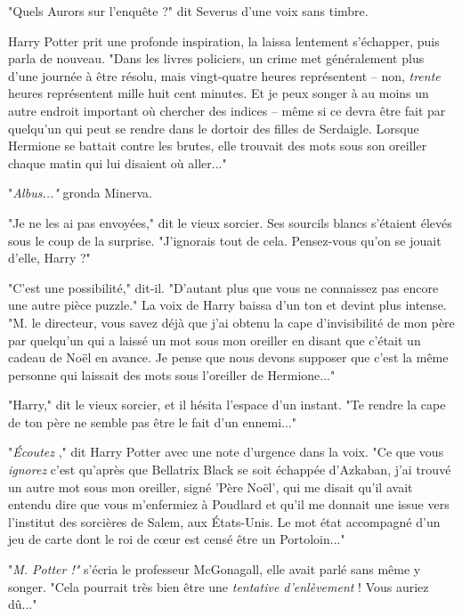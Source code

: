 "Quels Aurors sur l'enquête ?" dit Severus d'une voix sans timbre.

Harry Potter prit une profonde inspiration, la laissa lentement s'échapper, puis parla de nouveau. "Dans les livres policiers, un crime met généralement plus d'une journée à être résolu, mais vingt-quatre heures représentent – non, \emph{trente}  heures représentent mille huit cent minutes. Et je peux songer à au moins un autre endroit important où chercher des indices – même si ce devra être fait par quelqu'un qui peut se rendre dans le dortoir des filles de Serdaigle. Lorsque Hermione se battait contre les brutes, elle trouvait des mots sous son oreiller chaque matin qui lui disaient où aller..."

"\emph{Albus..."}  gronda Minerva.

"Je ne les ai pas envoyées," dit le vieux sorcier. Ses sourcils blancs s'étaient élevés sous le coup de la surprise. "J'ignorais tout de cela. Pensez-vous qu'on se jouait d'elle, Harry ?"

"C'est une possibilité," dit-il. "D'autant plus que vous ne connaissez pas encore une autre pièce puzzle." La voix de Harry baissa d'un ton et devint plus intense. "M. le directeur, vous savez déjà que j'ai obtenu la cape d'invisibilité de mon père par quelqu'un qui a laissé un mot sous mon oreiller en disant que c'était un cadeau de Noël en avance. Je pense que nous devons supposer que c'est la même personne qui laissait des mots sous l'oreiller de Hermione..."

"Harry," dit le vieux sorcier, et il hésita l'espace d'un instant. "Te rendre la cape de ton père ne semble pas être le fait d'un ennemi..."

"\emph{Écoutez} ," dit Harry Potter avec une note d'urgence dans la voix. "Ce que vous \emph{ignorez}  c'est qu'après que Bellatrix Black se soit échappée d'Azkaban, j'ai trouvé un autre mot sous mon oreiller, signé 'Père Noël', qui me disait qu'il avait entendu dire que vous m'enfermiez à Poudlard et qu'il me donnait une issue vers l'institut des sorcières de Salem, aux États-Unis. Le mot état accompagné d'un jeu de carte dont le roi de cœur est censé être un Portoloin..."

"\emph{M. Potter !"}  s'écria le professeur McGonagall, elle avait parlé sans même y songer. "Cela pourrait très bien être une \emph{tentative d'enlèvement } ! Vous auriez dû..."

